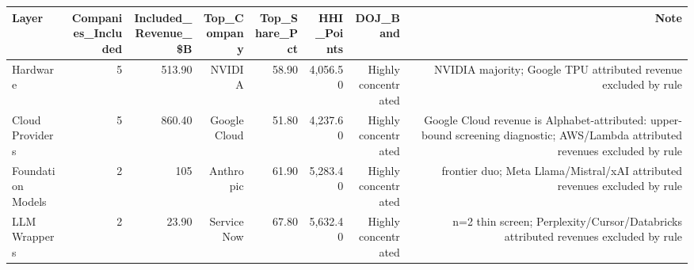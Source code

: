 

\begin{tabular}{@{}lrrrrrrr@{}}
\toprule
Layer & Companies\_Included & Included\_Revenue\_\$B & Top\_Company & Top\_Share\_Pct & HHI\_Points & DOJ\_Band & Note \\
\midrule
Hardware & 5 & 513.90 & NVIDIA & 58.90 & 4,056.50 & Highly concentrated & NVIDIA majority; Google TPU attributed revenue excluded by rule \\
Cloud Providers & 5 & 860.40 & Google Cloud & 51.80 & 4,237.60 & Highly concentrated & Google Cloud revenue is Alphabet-attributed: upper-bound screening diagnostic; AWS/Lambda attributed revenues excluded by rule \\
Foundation Models & 2 & 105 & Anthropic & 61.90 & 5,283.40 & Highly concentrated & frontier duo; Meta Llama/Mistral/xAI attributed revenues excluded by rule \\
LLM Wrappers & 2 & 23.90 & ServiceNow & 67.80 & 5,632.40 & Highly concentrated & n=2 thin screen; Perplexity/Cursor/Databricks attributed revenues excluded by rule \\
\bottomrule
\end{tabular}